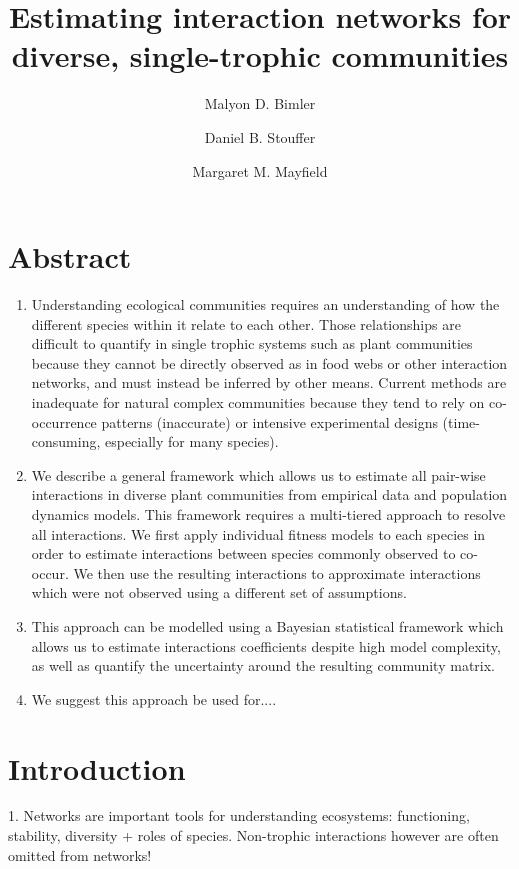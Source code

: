 \documentclass[a4,12pt]{article}
\title{Estimating interaction networks for diverse, single-trophic communities}
\author[1]{Malyon D. Bimler}
\author[2]{Daniel B. Stouffer}
\author[4]{Margaret M. Mayfield}
\affil[1]{First affiliation address, with corresponding author email. Email: malyonbimler@gmail.com}
\affil[2]{Second affiliation address}
\affil[3]{Third affiliation address}
\begin{document}
\maketitle  
\newpage

\tableofcontents

\section{Abstract}
    
    \begin{enumerate}
    \item Understanding ecological communities requires an understanding of how the different species within it relate to each other. Those relationships are difficult to quantify in single trophic systems such as plant communities because they cannot be directly observed as in food webs or other interaction networks, and must instead be inferred by other means. Current methods are inadequate for natural complex communities because they tend to rely on co-occurrence patterns (inaccurate) or intensive experimental designs (time-consuming, especially for many species). 
    \item We describe a general framework which allows us to estimate all pair-wise interactions in diverse plant communities from empirical data and population dynamics models. This framework requires a multi-tiered approach to resolve all interactions. We first apply individual fitness models to each species in order to estimate interactions between species commonly observed to co-occur. We then use the resulting interactions to approximate interactions which were not observed using a different set of assumptions. 
    \item This approach can be modelled using a Bayesian statistical framework which allows us to estimate interactions coefficients despite high model complexity, as well as quantify the uncertainty around the resulting community matrix. 
    \item We suggest this approach be used for....
    \end{enumerate}


\section{Introduction}
    
    1. Networks are important tools for understanding ecosystems: functioning, stability, diversity + roles of species. Non-trophic interactions however are often omitted from networks! 
\end{document}
